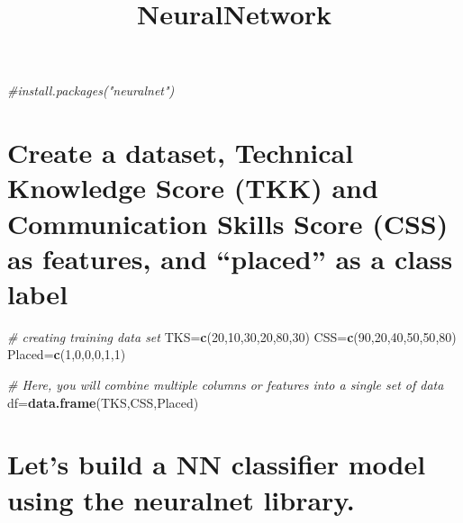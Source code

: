 \documentclass[
]{article}
\title{NeuralNetwork}
\author{}
\date{\vspace{-2.5em}}
\newenvironment{Shaded}{\begin{snugshade}}{\end{snugshade}}
\newcommand{\CommentTok}[1]{\textcolor[rgb]{0.56,0.35,0.01}{\textit{#1}}}
\newcommand{\DecValTok}[1]{\textcolor[rgb]{0.00,0.00,0.81}{#1}}
\newcommand{\KeywordTok}[1]{\textcolor[rgb]{0.13,0.29,0.53}{\textbf{#1}}}
\newcommand{\NormalTok}[1]{#1}
\begin{document}
\maketitle

\begin{Shaded}
\begin{Highlighting}[]
\CommentTok{#install.packages("neuralnet")}
\end{Highlighting}
\end{Shaded}

\hypertarget{create-a-dataset-technical-knowledge-score-tkk-and-communication-skills-score-css-as-features-and-placed-as-a-class-label}{%
\section{Create a dataset, Technical Knowledge Score (TKK) and
Communication Skills Score (CSS) as features, and ``placed'' as a class
label}\label{create-a-dataset-technical-knowledge-score-tkk-and-communication-skills-score-css-as-features-and-placed-as-a-class-label}}

\begin{Shaded}
\begin{Highlighting}[]
\CommentTok{# creating training data set}
\NormalTok{TKS=}\KeywordTok{c}\NormalTok{(}\DecValTok{20}\NormalTok{,}\DecValTok{10}\NormalTok{,}\DecValTok{30}\NormalTok{,}\DecValTok{20}\NormalTok{,}\DecValTok{80}\NormalTok{,}\DecValTok{30}\NormalTok{)}
\NormalTok{CSS=}\KeywordTok{c}\NormalTok{(}\DecValTok{90}\NormalTok{,}\DecValTok{20}\NormalTok{,}\DecValTok{40}\NormalTok{,}\DecValTok{50}\NormalTok{,}\DecValTok{50}\NormalTok{,}\DecValTok{80}\NormalTok{)}
\NormalTok{Placed=}\KeywordTok{c}\NormalTok{(}\DecValTok{1}\NormalTok{,}\DecValTok{0}\NormalTok{,}\DecValTok{0}\NormalTok{,}\DecValTok{0}\NormalTok{,}\DecValTok{1}\NormalTok{,}\DecValTok{1}\NormalTok{)}

\CommentTok{# Here, you will combine multiple columns or features into a single set of data}
\NormalTok{df=}\KeywordTok{data.frame}\NormalTok{(TKS,CSS,Placed)}
\end{Highlighting}
\end{Shaded}

\hypertarget{lets-build-a-nn-classifier-model-using-the-neuralnet-library.}{%
\section{Let's build a NN classifier model using the neuralnet
library.}\label{lets-build-a-nn-classifier-model-using-the-neuralnet-library.}}
\end{document}
